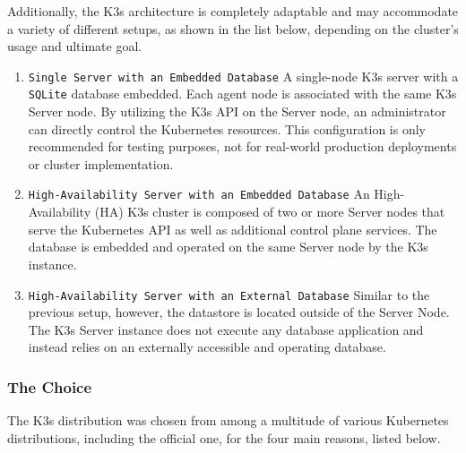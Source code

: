 Additionally, the K3s architecture is completely adaptable and may accommodate a
variety of different setups, as shown in the list below, depending on the cluster's
usage and ultimate goal\cite{k3s_architecture}.
\begin{enumerate}
  \item \texttt{Single Server with an Embedded Database}
    \newline
    A single-node K3s server with a \texttt{SQLite} database embedded. Each
    agent node is associated with the same K3s Server node. By utilizing the K3s
    API on the Server node, an administrator can directly control the Kubernetes
    resources.
    \newline
    This configuration is only recommended for testing purposes, not for real-world
    production deployments or cluster implementation.

  \item \texttt{High-Availability Server with an Embedded Database}
    \newline
    An High-Availability (HA) K3s cluster is composed of two or more Server
    nodes that serve the Kubernetes API as well as additional control plane
    services. The database is embedded and operated on the same Server node by the
    K3s instance.

  \item \texttt{High-Availability Server with an External Database}
    \newline
    Similar to the previous setup, however, the datastore is located outside of
    the Server Node. The K3s Server instance does not execute any database application
    and instead relies on an externally accessible and operating database.
\end{enumerate}

\subsubsection{The Choice}
\label{subsubsec:implementation_dependencies_k3s_the_choice}

The K3s distribution was chosen from among a multitude of various Kubernetes distributions,
including the official one, for the four main reasons, listed below.

